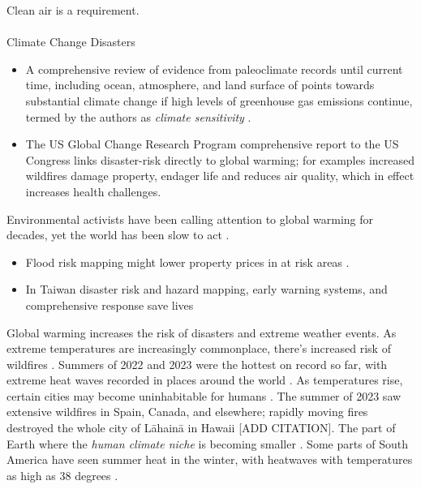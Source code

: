 \documentclass[
  letterpaper,
  DIV=11,
  numbers=noendperiod]{scrartcl}
\makeatletter
\let\oldparagraph\paragraph
\renewcommand{\paragraph}{
    \@ifstar
      \xxxParagraphStar
      \xxxParagraphNoStar
  }
\newcommand{\xxxParagraphStar}[1]{\oldparagraph*{#1}\mbox{}}
\newcommand{\xxxParagraphNoStar}[1]{\oldparagraph{#1}\mbox{}}
\makeatother
\begin{document}
Clean air is a requirement.

\paragraph{Climate Change Disasters}\label{climate-change-disasters}

\begin{itemize}
\item
  A comprehensive review of evidence from paleoclimate records until
  current time, including ocean, atmosphere, and land surface of points
  towards substantial climate change if high levels of greenhouse gas
  emissions continue, termed by the authors as \emph{climate
  sensitivity} \citep{sherwoodAssessmentEarthClimate2020}.
\item
  \citep{FifthNationalClimate2023} The US Global Change Research Program
  comprehensive report to the US Congress links disaster-risk directly
  to global warming; for examples increased wildfires damage property,
  endager life and reduces air quality, which in effect increases health
  challenges.
\end{itemize}

Environmental activists have been calling attention to global warming
for decades, yet the world has been slow to act
\citep{mckibbenEndNature1989}.

\begin{itemize}
\item
  Flood risk mapping might lower property prices in at risk areas
  \citep{sherrenFloodRiskMapping2024}.
\item
  In Taiwan disaster risk and hazard mapping, early warning systems, and
  comprehensive response save lives
  \citet{tsaiFrameworkEmergencyResponse2021}
\end{itemize}

Global warming increases the risk of disasters and extreme weather
events. As extreme temperatures are increasingly commonplace, there's
increased risk of wildfires \citep{volkovaEffectsPrescribedFire2021}.
Summers of 2022 and 2023 were the hottest on record so far, with extreme
heat waves recorded in places around the world
\citep{venturelliHighTemperatureCOVID192023, serrano-notivoliUnprecedentedWarmthLook2023, douglasThisSummerTrack2023, EarthJustHad2023, NOAAJune2023, falconer123MillionHeat2023}.
As temperatures rise, certain cities may become uninhabitable for humans
\citep{cbcradioExtremeHeatCould2021}. The summer of 2023 saw extensive
wildfires in Spain, Canada, and elsewhere; rapidly moving fires
destroyed the whole city of Lāhainā in Hawaii {[}ADD CITATION{]}. The
part of Earth where the \emph{human climate niche} is becoming smaller
\citep{mckibbenWhereShouldLive2023}. Some parts of South America have
seen summer heat in the winter, with heatwaves with temperatures as high
as 38 degrees \citep{livingstonItMidwinterIt2023}.
\end{document}
